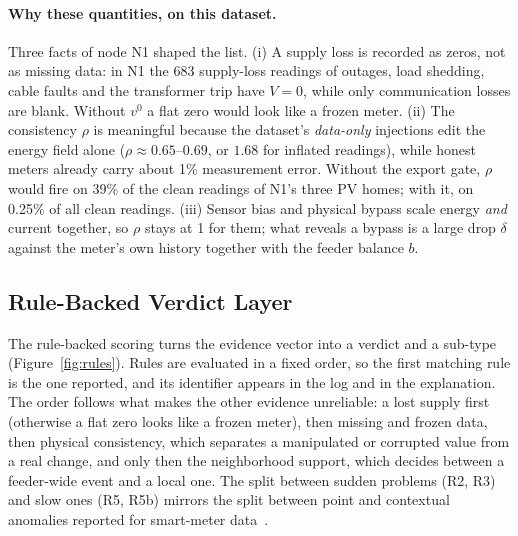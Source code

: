 \documentclass[11pt,a4paper]{article}
\begin{document}
\paragraph{Why these quantities, on this dataset.} Three facts of node N1 shaped the list.
(i) A supply loss is recorded as zeros, not as missing data: in N1 the 683 supply-loss readings of outages, load
shedding, cable faults and the transformer trip have $V=0$, while only communication losses are blank. Without
$v^{0}$ a flat zero would look like a frozen meter. (ii) The consistency $\rho$ is meaningful because the
dataset's \emph{data-only} injections edit the energy field alone ($\rho\approx0.65$--$0.69$, or $1.68$ for
inflated readings), while honest meters already carry about 1\% measurement error. Without the export gate,
$\rho$ would fire on 39\% of the clean readings of N1's three PV homes; with it, on 0.25\% of all clean
readings. (iii) Sensor bias and physical bypass scale energy \emph{and} current together, so $\rho$ stays at 1
for them; what reveals a bypass is a large drop $\delta$ against the meter's own history together with the
feeder balance $b$.

\subsection{Rule-Backed Verdict Layer}
\label{sec:rules}
The rule-backed scoring turns the evidence vector into a verdict and a sub-type (Figure~\ref{fig:rules}).
Rules are evaluated in a fixed order, so the first matching rule is the one reported, and its identifier
appears in the log and in the explanation. The order follows what makes the other evidence unreliable: a lost
supply first (otherwise a flat zero looks like a frozen meter), then missing and frozen data, then physical
consistency, which separates a manipulated or corrupted value from a real change, and only then the
neighborhood support, which decides between a feeder-wide event and a local one. The split between sudden
problems (R2, R3) and slow ones (R5, R5b) mirrors the split between point and contextual anomalies reported for
smart-meter data~\cite{timefreq}.
\end{document}
